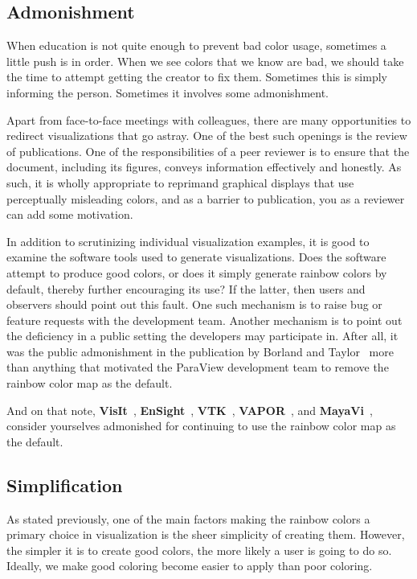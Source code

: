 \documentclass[letterpaper,twocolumn,fleqn]{article}
\newcommand*{\lcite}[1]{~\cite{#1}}
\newcommand*{\scite}[1]{~\cite{#1}}
\begin{document}
\subsection{Admonishment}

\noindent
When education is not quite enough to prevent bad color usage, sometimes a
little push is in order. When we see colors that we know are bad, we should
take the time to attempt getting the creator to fix them. Sometimes this is
simply informing the person. Sometimes it involves some admonishment.

Apart from face-to-face meetings with colleagues, there are many
opportunities to redirect visualizations that go astray. One of the best
such openings is the review of publications. One of the responsibilities of
a peer reviewer is to ensure that the document, including its figures,
conveys information effectively and honestly. As such, it is wholly
appropriate to reprimand graphical displays that use perceptually
misleading colors, and as a barrier to publication, you as a reviewer can
add some motivation.

In addition to scrutinizing individual visualization examples, it is good
to examine the software tools used to generate visualizations. Does the
software attempt to produce good colors, or does it simply generate rainbow
colors by default, thereby further encouraging its use? If the latter, then
users and observers should point out this fault. One such mechanism is to
raise bug or feature requests with the development team. Another mechanism
is to point out the deficiency in a public setting the developers may
participate in. After all, it was the public admonishment in the
publication by Borland and Taylor\scite{Borland2007} more than anything
that motivated the ParaView development team to remove the rainbow color
map as the default.

And on that note, \textbf{VisIt}\lcite{VisIt},
\textbf{EnSight}\lcite{EnSight}, \textbf{VTK}\lcite{VTK},
\textbf{VAPOR}\lcite{VAPOR}, and \textbf{MayaVi}\lcite{MayaVi}, consider
yourselves admonished for continuing to use the rainbow color map as the
default.

\subsection{Simplification}

\noindent
As stated previously, one of the main factors making the rainbow colors a
primary choice in visualization is the sheer simplicity of creating them.
However, the simpler it is to create good colors, the more likely a user is
going to do so. Ideally, we make good coloring become easier to apply than
poor coloring.
\end{document}

